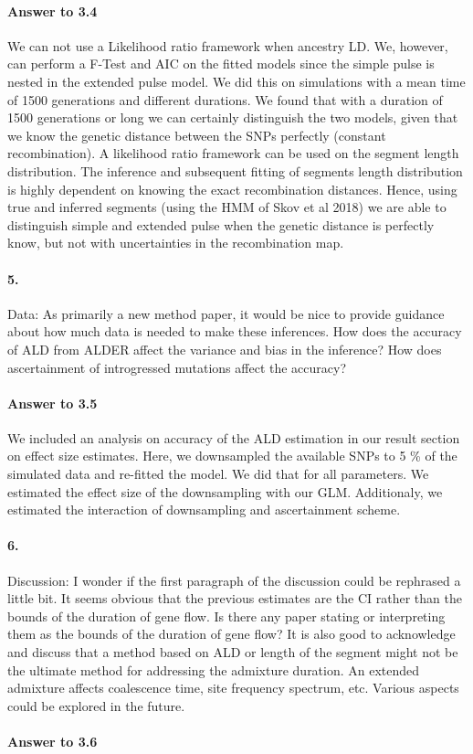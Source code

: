 \documentclass[11pt]{article}
\let\oldparagraph\paragraph
\renewcommand{\paragraph}[1]{\oldparagraph{#1}\mbox{}}
\begin{document}
\paragraph{Answer to 3.4}
We can not use a Likelihood ratio framework when ancestry LD. We, however, can perform a F-Test and AIC on the fitted models since the simple pulse is nested in the extended pulse model. We did this on simulations with a mean time of 1500 generations and different durations. We found that with a duration of 1500 generations or long we can certainly distinguish the two models, given that we know the genetic distance between the SNPs perfectly (constant recombination). A likelihood ratio framework can be used on the segment length distribution. The inference and subsequent fitting of segments length distribution is highly dependent on knowing the exact recombination distances. Hence, using true and inferred segments (using the HMM of Skov et al 2018) we are able to distinguish simple and extended pulse when the genetic distance is perfectly know, but not with uncertainties in the recombination map.

\paragraph{5.} 
Data: As primarily a new method paper, it would be nice to provide guidance about how much data is needed to make these inferences. 
How does the accuracy of ALD from ALDER affect the variance and bias in the inference? 
How does ascertainment of introgressed mutations affect the accuracy? 

\paragraph{Answer to 3.5}
We included an analysis on accuracy of the ALD estimation in our result section on effect size estimates. Here, we downsampled the available SNPs to 5 \% of the simulated data and re-fitted the model. We did that for all parameters. We estimated the effect size of the downsampling with our GLM. Additionaly, we estimated the interaction of downsampling and ascertainment scheme. 

\paragraph{6.} 
Discussion: I wonder if the first paragraph of the discussion could be rephrased a little bit. It seems obvious that the previous estimates are the CI rather than the bounds of the duration of gene flow. Is there any paper stating or interpreting them as the bounds of the duration of gene flow? It is also good to acknowledge and discuss that a method based on ALD or length of the segment might not be the ultimate method for addressing the admixture duration. An extended admixture affects coalescence time, site frequency spectrum, etc. Various aspects could be explored in the future.

\paragraph{Answer to 3.6}
\end{document}
